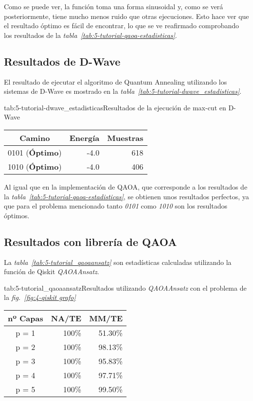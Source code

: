 Como se puede ver, la función toma una forma sinusoidal y, como se verá posteriormente, tiene mucho menos ruido que otras ejecuciones.
Esto hace ver que el resultado óptimo es fácil de encontrar, lo que se ve reafirmado comprobando los resultados de la \textit{tabla~\ref{tab:5-tutorial-qaoa-estadisticas}}.

\subsection{Resultados de D-Wave}

El resultado de ejecutar el algoritmo de Quantum Annealing utilizando los sistemas de D-Wave es mostrado en la \textit{tabla~\ref{tab:5-tutorial-dwave_estadisticas}}.

\begin{table}[Resultados D-Wave {--} max-cut en grafo de 4 aristas]{tab:5-tutorial-dwave_estadisticas}{Resultados de la ejecución de max-cut en D-Wave}
  \begin{tabular}{|c|r|r|}
    \hline
    \textbf{Camino}        & \textbf{Energía} & \textbf{Muestras} \\ \hline
    0101 (\textbf{Óptimo}) & -4.0             & 618               \\ \hline
    1010 (\textbf{Óptimo}) & -4.0             & 406               \\ \hline
  \end{tabular}
\end{table}

Al igual que en la implementación de QAOA, que corresponde a los resultados de la \textit{tabla~\ref{tab:5-tutorial-qaoa-estadisticas}}, se obtienen unos resultados perfectos, ya que para el problema mencionado tanto \textit{0101} como \textit{1010} son los resultados óptimos.

\subsection{Resultados con librería de QAOA}

La \textit{tabla~\ref{tab:5-tutorial_qaoaansatz}} son estadísticas calculadas utilizando la función de Qiskit \textit{QAOAAnsatz}.

\begin{table}[Resultados QAOAAnsatz {--} max-cut en grafo de 4 aristas]{tab:5-tutorial_qaoaansatz}{Resultados utilizando \textit{QAOAAnsatz} con el problema de la \textit{fig.~\ref{fig:4-qiskit grafo}}}
  \begin{tabular}{|c|r|r|}
    \hline
    \textbf{nº Capas} & \textbf{NA/TE} & \textbf{MM/TE} \\ \hline
    p = 1 & 100\% & 51.30\% \\ \hline
    p = 2 & 100\% & 98.13\% \\ \hline
    p = 3 & 100\% & 95.83\% \\ \hline
    p = 4 & 100\% & 97.71\% \\ \hline
    p = 5 & 100\% & 99.50\% \\ \hline
  \end{tabular}
\end{table}

